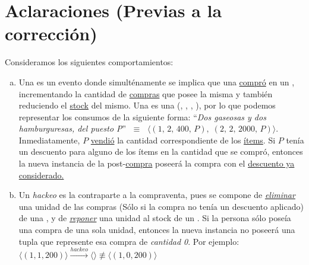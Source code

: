 \documentclass[10pt, a4paper]{article}
\date{\today}
\renewcommand{\tadNombre}[1]{\text{\scshape{#1}}}
\begin{document}
\maketitle{}
\tableofcontents
{}
\newpage

\section{Aclaraciones (Previas a la corrección)} {
    Consideramos los siguientes comportamientos: 
    \begin{enumerate}[a)]
        \item Una \textit{\compraventa{}} es un evento donde simulténamente se implica que una \persona{} \hyperref[comprar]{compró} en un \puesto, incrementando la cantidad de \hyperref[Compra]{compras} que posee la misma y también reduciendo el \hyperref[renombres]{stock} del mismo. Una \Compra{} es una \tadNombre{Tupla}(\hyperref[renombres]{\tadNombre{Ítem}}, \hyperref[renombres]{\tadNombre{Cantidad}}, \Gasto, \Puesto), por lo que podemos representar los consumos de la siguiente forma: ``\textit{Dos gaseosas y dos hamburguresas, del puesto P}'' $\;\equiv\;$ $\langle(1,\,2,\,400,\,P),\;(2,\,2,\,2000,\,P)\rangle$. Inmediatamente, $P$ \hyperref[vender]{vendió} la cantidad correspondiente de los \hyperref[renombres]{ítems}. Si $P$ tenía un descuento para alguno de los ítems en la cantidad que se compró, entonces la nueva instancia de la \persona{} post-\hyperref[comprar]{compra} poseerá la compra con el \hyperref[aplicarDescuento]{descuento ya considerado.}
        \item Un \textit{hackeo} es la contraparte a la compraventa, pues se compone de \hyperref[eliminarConsumo]{\textit{eliminar}} una unidad de las compras (Sólo si la compra no tenía un descuento aplicado) de una \persona{}, y de \hyperref[devolverUnidadVenta]{\textit{reponer}} una unidad al stock de un \puesto. Si la persona sólo poseía una compra de una sola unidad, entonces la nueva instancia no poseerá una tupla que represente esa compra de \textit{cantidad 0}. Por ejemplo: $\langle(1,1,200)\rangle \xrightarrow{hackeo} \langle\rangle \not\equiv \langle(1,0,200)\rangle$
    \end{enumerate}
    
}
\end{document}
